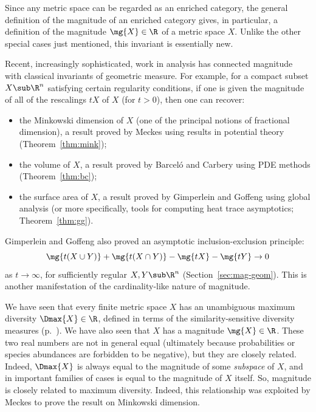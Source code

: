 Since any metric space can be regarded as an enriched
category, the general definition of the magnitude of an enriched category
gives, in particular, a definition of the magnitude $\mg{X} \in \R$ of a
metric space $X$.  Unlike the other special cases just mentioned, this
invariant is essentially new.

Recent, increasingly sophisticated, work in analysis has connected
magnitude with classical invariants of geometric measure.  For example, for
a compact subset $X \sub \R^n$ satisfying certain regularity conditions, if
one is given the magnitude of all of the rescalings $tX$ of $X$ (for $t >
0$), then one can recover:
% 
\begin{itemize}
\item 
the Minkowski dimension of $X$ (one of the principal
notions of fractional dimension), a result proved by Meckes using results
in potential theory (Theorem~\ref{thm:mink});

\item
the volume of $X$, a result proved by Barcel\'o and Carbery
using PDE methods (Theorem~\ref{thm:bc});

\item
the surface%
%
%
area of $X$, a result proved by Gimperlein and Goffeng using
global analysis (or more specifically, tools for computing heat trace
asymptotics; Theorem~\ref{thm:gg}).   
\end{itemize}
% 
Gimperlein and Goffeng also proved an asymptotic
inclusion-exclusion%
%
%
principle:
\[
\mg{t(X \cup Y)} + \mg{t(X \cap Y)} - \mg{tX} - \mg{tY}
\to 0
\]
as $t \to \infty$, for sufficiently regular $X, Y \sub \R^n$
(Section~\ref{sec:mag-geom}).  This is another manifestation of the
cardinality-like nature of magnitude.

We have seen that every finite metric space $X$ has an unambiguous maximum
diversity $\Dmax{X} \in \R$, defined in terms of the similarity-sensitive
diversity measures (p.~\pageref{p:max-intro}).  We have also seen that $X$
has a magnitude $\mg{X} \in \R$.  These two real numbers are not in general
equal (ultimately because probabilities or species abundances are forbidden
to be negative),%
%
%
but they are closely related.  Indeed, $\Dmax{X}$ is always equal to the
magnitude of some \emph{subspace} of $X$, and in important families of
cases is equal to the magnitude of $X$ itself.  So, magnitude is closely
related to maximum diversity.  Indeed, this relationship was exploited by
Meckes%
%
% 
to prove the result on Minkowski dimension.

